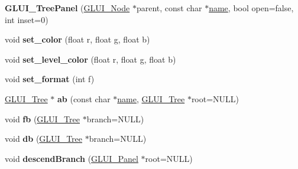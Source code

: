 \begin{DoxyCompactItemize}
\item 
\hypertarget{class_g_l_u_i___tree_panel_a17ff7ac24968bdad9adfd4356361925e}{{\bfseries G\+L\+U\+I\+\_\+\+Tree\+Panel} (\hyperlink{class_g_l_u_i___node}{G\+L\+U\+I\+\_\+\+Node} $\ast$parent, const char $\ast$\hyperlink{class_g_l_u_i___control_aa95b97d50df45335fc33f0af03958eb3}{name}, bool open=false, int inset=0)}\label{class_g_l_u_i___tree_panel_a17ff7ac24968bdad9adfd4356361925e}

\item 
\hypertarget{class_g_l_u_i___tree_panel_af87e1c64a80d4179e48dc93f513ca41d}{void {\bfseries set\+\_\+color} (float r, float g, float b)}\label{class_g_l_u_i___tree_panel_af87e1c64a80d4179e48dc93f513ca41d}

\item 
\hypertarget{class_g_l_u_i___tree_panel_a8b951971bf5b8416624ff02fa60c0528}{void {\bfseries set\+\_\+level\+\_\+color} (float r, float g, float b)}\label{class_g_l_u_i___tree_panel_a8b951971bf5b8416624ff02fa60c0528}

\item 
\hypertarget{class_g_l_u_i___tree_panel_ad695187114e8a0de9cf42c15ab1203c9}{void {\bfseries set\+\_\+format} (int f)}\label{class_g_l_u_i___tree_panel_ad695187114e8a0de9cf42c15ab1203c9}

\item 
\hypertarget{class_g_l_u_i___tree_panel_aecf342fd8eae7b20039255f1c302b1c4}{\hyperlink{class_g_l_u_i___tree}{G\+L\+U\+I\+\_\+\+Tree} $\ast$ {\bfseries ab} (const char $\ast$\hyperlink{class_g_l_u_i___control_aa95b97d50df45335fc33f0af03958eb3}{name}, \hyperlink{class_g_l_u_i___tree}{G\+L\+U\+I\+\_\+\+Tree} $\ast$root=N\+U\+L\+L)}\label{class_g_l_u_i___tree_panel_aecf342fd8eae7b20039255f1c302b1c4}

\item 
\hypertarget{class_g_l_u_i___tree_panel_ae4b712e959b301b046ecc8fee39a3161}{void {\bfseries fb} (\hyperlink{class_g_l_u_i___tree}{G\+L\+U\+I\+\_\+\+Tree} $\ast$branch=N\+U\+L\+L)}\label{class_g_l_u_i___tree_panel_ae4b712e959b301b046ecc8fee39a3161}

\item 
\hypertarget{class_g_l_u_i___tree_panel_ab9ab4943caa74579295980862a660eb0}{void {\bfseries db} (\hyperlink{class_g_l_u_i___tree}{G\+L\+U\+I\+\_\+\+Tree} $\ast$branch=N\+U\+L\+L)}\label{class_g_l_u_i___tree_panel_ab9ab4943caa74579295980862a660eb0}

\item 
\hypertarget{class_g_l_u_i___tree_panel_a2db40b406b533cbb37a815ec6b40b9d9}{void {\bfseries descend\+Branch} (\hyperlink{class_g_l_u_i___panel}{G\+L\+U\+I\+\_\+\+Panel} $\ast$root=N\+U\+L\+L)}\label{class_g_l_u_i___tree_panel_a2db40b406b533cbb37a815ec6b40b9d9}


\end{DoxyCompactItemize}
